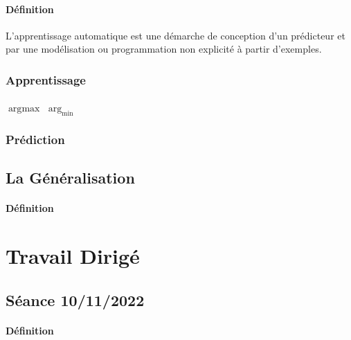 \documentclass{article}
\begin{document}
\paragraph{Définition}L'apprentissage automatique est une démarche de conception d'un prédicteur et par une modélisation ou programmation non explicité à partir d'exemples.

\subsubsection{Apprentissage}
\paragraph{}
$\arg\text{max}$
$\arg_{\text{min}}$

\subsubsection{Prédiction}


\subsection{La Généralisation}
\paragraph{Définition}


\section{Travail Dirigé}
\subsection{Séance 10/11/2022}
\paragraph{Définition}
\end{document}
